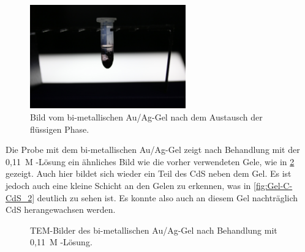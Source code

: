 		\begin{figure}[H]
			\centering
			\includegraphics[width=0.6\textwidth]{Bilder/Foto-Gel-cit} 	
			\caption{Bild vom bi-metallischen Au/Ag-Gel nach dem Austausch der flüssigen Phase.}
			\label{fig:Foto-Gel-cit}
		\end{figure}
	
		Die Probe mit dem bi-metallischen Au/Ag-Gel zeigt nach Behandlung mit der 0,11~M -Lösung ein ähnliches Bild wie die vorher verwendeten Gele, wie in \cref{fig:Gel-C-CdS} gezeigt.
		Auch hier bildet sich wieder ein Teil des CdS neben dem Gel.
		Es ist jedoch auch eine kleine Schicht an den Gelen zu erkennen, was in \cref{fig:Gel-C-CdS_2} deutlich zu sehen ist.
		Es konnte also auch an diesem Gel nachträglich CdS herangewachsen werden.
		
		\begin{figure}[htbp]
			\centering
			\caption{TEM-Bilder des bi-metallischen Au/Ag-Gel nach Behandlung mit 0,11~M -Lösung.}
			\label{fig:Gel-C-CdS}
		\end{figure}
		
		 
		
		
		
		
	   
	
 
 